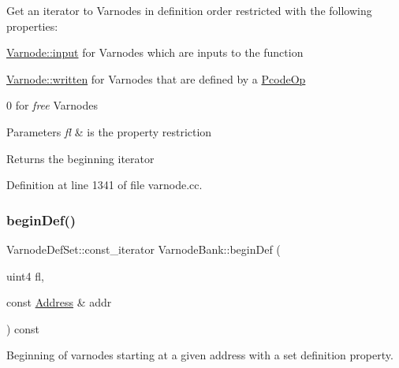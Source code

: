 Get an iterator to Varnodes in definition order restricted with the following properties\+:
\begin{DoxyItemize}
\item \mbox{\hyperlink{class_varnode_ad367c0ac3c08b6f41e7334e90a138e8ca9c9363556459d8828a5ab58c370ccd2e}{Varnode\+::input}} for Varnodes which are inputs to the function
\item \mbox{\hyperlink{class_varnode_ad367c0ac3c08b6f41e7334e90a138e8ca16c6748ecb7542c2f79d81be83098dd5}{Varnode\+::written}} for Varnodes that are defined by a \mbox{\hyperlink{class_pcode_op}{Pcode\+Op}}
\item 0 for {\itshape free} Varnodes 
\begin{DoxyParams}{Parameters}
{\em fl} & is the property restriction \\
\hline
\end{DoxyParams}
\begin{DoxyReturn}{Returns}
the beginning iterator 
\end{DoxyReturn}

\end{DoxyItemize}

Definition at line 1341 of file varnode.\+cc.

\mbox{\label{class_varnode_bank_a657f9d8a88aa678d39ec1ba3691647eb}} 
\subsubsection{\texorpdfstring{beginDef()}{beginDef()}\hspace{0.1cm}{\footnotesize\ttfamily [3/3]}}
{\footnotesize\ttfamily Varnode\+Def\+Set\+::const\+\_\+iterator Varnode\+Bank\+::begin\+Def (\begin{DoxyParamCaption}\item[{uint4}]{fl,  }\item[{const \mbox{\hyperlink{class_address}{Address}} \&}]{addr }\end{DoxyParamCaption}) const}



Beginning of varnodes starting at a given address with a set definition property. 

